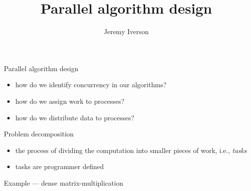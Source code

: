 \documentclass[10pt, t]{beamer}
\title{Parallel algorithm design}
\date{}
\author{Jeremy Iverson}
\institute{College of Saint Benedict \& Saint John's University}
\begin{document}
  \begin{frame}
    \titlepage
  \end{frame}

  \begin{frame}{Parallel algorithm design}
    \begin{itemize}
      \item how do we identify concurrency in our algorithms?
      \item how do we assign work to processes?
      \item how do we distribute data to processes?
    \end{itemize}

  \end{frame}

  \begin{frame}{Problem decomposition}
    \begin{itemize}
      \item the process of dividing the computation into smaller pieces of work,
        i.e., \emph{tasks}
      \item tasks are programmer defined
    \end{itemize}

  \end{frame}

  \begin{frame}{Example --- dense matrix-multiplication}
  \end{frame}
\end{document}
